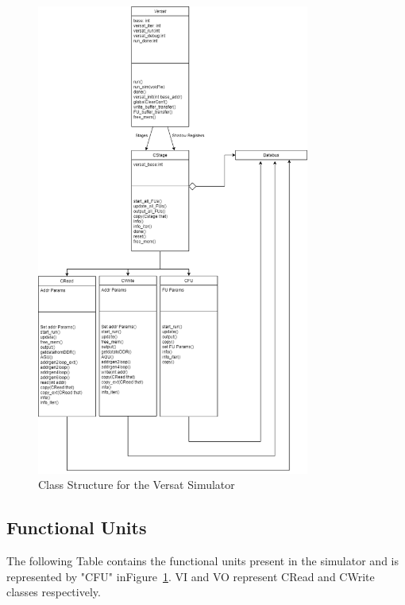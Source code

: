 \begin{figure}[!htbp]
    \centering
    \includegraphics[width=0.8\textwidth]{Figures/VersatSimulatorDraw.drawio.png}
    \caption{Class Structure for the Versat Simulator}
    \label{figure:VersatSimulatorClass}
\end{figure} 


\subsection{Functional Units}

The following Table contains the functional units present in the simulator 
and is represented by 
"CFU" inFigure~\ref{figure:VersatSimulatorClass}. 
VI and VO represent CRead and CWrite 
classes respectively.



